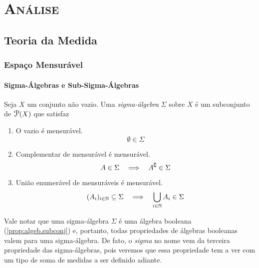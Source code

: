 \part{{\scshape Análise}}

\chapter{Teoria da Medida}

\section{Espaço Mensurável}

\subsection{Sigma-Álgebras e Sub-Sigma-Álgebras}

\begin{defi}
	Seja $X$ um conjunto não vazio. Uma \emph{sigma-álgebra} $\Sigma$ sobre $X$ é um subconjunto de $\p(X)$ que satisfaz
	\begin{enumerate}
	\item O vazio é mensurável.
	\begin{equation*}
	\emptyset \in \Sigma
	\end{equation*}

	\item Complementar de mensurável é mensurável.
	\begin{equation*}
	A \in \Sigma \quad \Longrightarrow \quad A^\complement \in \Sigma
	\end{equation*}
	\item União enumerável de mensuráveis é mensurável.
	\begin{equation*}
	(A_i)_{i \in \mathbb{N}} \subseteq \Sigma \quad \Longrightarrow \quad \bigcup_{i \in \mathbb{N}} A_i \in \Sigma
	\end{equation*}
	\end{enumerate}
\end{defi}

	Vale notar que uma sigma-álgebra $\Sigma$ é uma álgebra booleana (\ref{prop:algeb.subconj}) e, portanto, todas propriedades de álgebras booleanas valem para uma sigma-álgebra. De fato, o \textit{sigma} no nome vem da terceira propriedade das sigma-álgebras, pois veremos que essa propriedade tem a ver com um tipo de soma de medidas a ser definido adiante.

